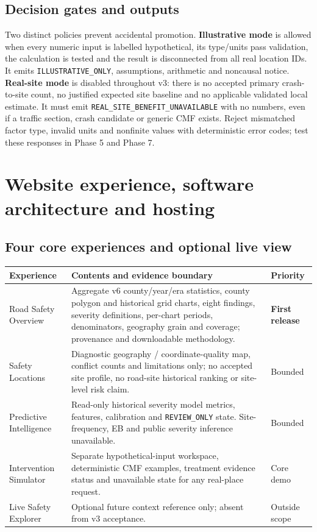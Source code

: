 \documentclass[11pt,a4paper,openany]{report}
\newcommand{\pathcode}[1]{\nolinkurl{#1}}
\begin{document}
\section{Decision gates and outputs}
Two distinct policies prevent accidental promotion. \textbf{Illustrative mode} is allowed when every numeric input is labelled hypothetical, its type/units pass validation, the calculation is tested and the result is disconnected from all real location IDs. It emits \pathcode{ILLUSTRATIVE_ONLY}, assumptions, arithmetic and noncausal notice. \textbf{Real-site mode} is disabled throughout v3: there is no accepted primary crash-to-site count, no justified expected site baseline and no applicable validated local estimate. It must emit \pathcode{REAL_SITE_BENEFIT_UNAVAILABLE} with no numbers, even if a traffic section, crash candidate or generic CMF exists. Reject mismatched factor type, invalid units and nonfinite values with deterministic error codes; test these responses in Phase 5 and Phase 7.

\chapter{Website experience, software architecture and hosting}
\section{Four core experiences and optional live view}
\small
\begin{tabularx}{\linewidth}{@{}L{38mm}Y L{19mm}@{}}\toprule
Experience & Contents and evidence boundary & Priority\\\midrule
Road Safety Overview & Aggregate v6 county/year/era statistics, county polygon and historical grid charts, eight findings, severity definitions, per-chart periods, denominators, geography grain and coverage; provenance and downloadable methodology. & \textbf{First release}\\
Safety Locations & Diagnostic geography / coordinate-quality map, conflict counts and limitations only; no accepted site profile, no road-site historical ranking or site-level risk claim. & Bounded\\
Predictive Intelligence & Read-only historical severity model metrics, features, calibration and \pathcode{REVIEW_ONLY} state. Site-frequency, EB and public severity inference unavailable. & Bounded\\
Intervention Simulator & Separate hypothetical-input workspace, deterministic CMF examples, treatment evidence status and unavailable state for any real-place request. & Core demo\\
Live Safety Explorer & Optional future context reference only; absent from v3 acceptance. & Outside scope\\
\bottomrule\end{tabularx}
\normalsize
\end{document}
